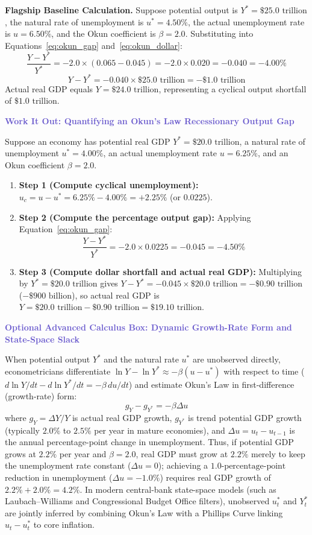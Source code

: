\documentclass[11pt, a4paper]{article}
\newcommand{\boxheader}[2]{\textbf{\textcolor{#1}{#2}}\par\smallskip}
\begin{document}
\textbf{Flagship Baseline Calculation.} Suppose potential output is $Y^* = \$25.0\text{ trillion}$, the natural rate of unemployment is $u^* = 4.50\%$, the actual unemployment rate is $u = 6.50\%$, and the Okun coefficient is $\beta = 2.0$. Substituting into Equations~\eqref{eq:okun_gap} and~\eqref{eq:okun_dollar}:
\[
  \frac{Y - Y^*}{Y^*} = -2.0 \times (0.065 - 0.045) = -2.0 \times 0.020 = -0.040 = -4.00\%
\]
\[
  Y - Y^* = -0.040 \times \$25.0\text{ trillion} = -\$1.0\text{ trillion}
\]
Actual real GDP equals $Y = \$24.0\text{ trillion}$, representing a cyclical output shortfall of $\$1.0\text{ trillion}$.

\begin{casestudy}
\boxheader{SlateBlue}{Work It Out: Quantifying an Okun's Law Recessionary Output Gap}
Suppose an economy has potential real GDP $Y^* = \$20.0\text{ trillion}$, a natural rate of unemployment $u^* = 4.00\%$, an actual unemployment rate $u = 6.25\%$, and an Okun coefficient $\beta = 2.0$.
\begin{enumerate}[leftmargin=1.5em, itemsep=2pt, topsep=3pt]
  \item \textbf{Step 1 (Compute cyclical unemployment):} $u_c = u - u^* = 6.25\% - 4.00\% = +2.25\%$ (or $0.0225$).
  \item \textbf{Step 2 (Compute the percentage output gap):} Applying Equation~\eqref{eq:okun_gap}:
  \[
    \frac{Y - Y^*}{Y^*} = -2.0 \times 0.0225 = -0.045 = -4.50\%
  \]
  \item \textbf{Step 3 (Compute dollar shortfall and actual real GDP):} Multiplying by $Y^* = \$20.0\text{ trillion}$ gives $Y - Y^* = -0.045 \times \$20.0\text{ trillion} = -\$0.90\text{ trillion}$ ($-\$900\text{ billion}$), so actual real GDP is $Y = \$20.0\text{ trillion} - \$0.90\text{ trillion} = \$19.10\text{ trillion}$.
\end{enumerate}
\end{casestudy}

\begin{casestudy}
\boxheader{SlateBlue}{Optional Advanced Calculus Box: Dynamic Growth-Rate Form and State-Space Slack}
When potential output $Y^*$ and the natural rate $u^*$ are unobserved directly, econometricians differentiate $\ln Y - \ln Y^* \approx -\beta (u - u^*)$ with respect to time ($d\ln Y/dt - d\ln Y^*/dt = -\beta\, du/dt$) and estimate Okun's Law in first-difference (growth-rate) form:
\[
  g_Y - g_{Y^*} = -\beta \Delta u
\]
where $g_Y = \Delta Y / Y$ is actual real GDP growth, $g_{Y^*}$ is trend potential GDP growth (typically $2.0\%$ to $2.5\%$ per year in mature economies), and $\Delta u = u_t - u_{t-1}$ is the annual percentage-point change in unemployment. Thus, if potential GDP grows at $2.2\%$ per year and $\beta = 2.0$, real GDP must grow at $2.2\%$ merely to keep the unemployment rate constant ($\Delta u = 0$); achieving a $1.0\text{-percentage-point}$ reduction in unemployment ($\Delta u = -1.0\%$) requires real GDP growth of $2.2\% + 2.0\% = 4.2\%$. In modern central-bank state-space models (such as Laubach--Williams and Congressional Budget Office filters), unobserved $u_t^*$ and $Y_t^*$ are jointly inferred by combining Okun's Law with a Phillips Curve linking $u_t - u_t^*$ to core inflation.
\end{casestudy}
\end{document}
